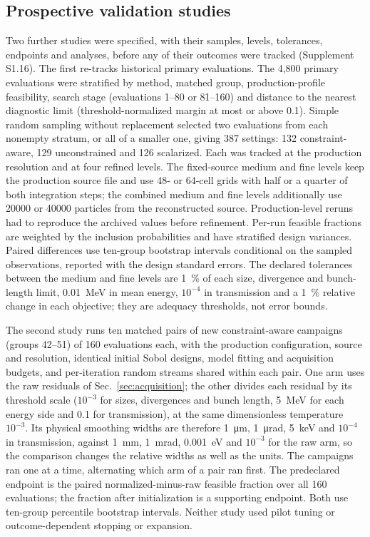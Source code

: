 \documentclass[aps,prab,reprint,superscriptaddress,amsmath,amssymb,floatfix]{revtex4-2}
\begin{document}
\subsection{Prospective validation studies}
\label{sec:prospective}
Two further studies were specified, with their samples, levels, tolerances, endpoints and
analyses, before any of their outcomes were tracked (Supplement S1.16). The first re-tracks
historical primary evaluations. The 4,800 primary evaluations were stratified by method, matched
group, production-profile feasibility, search stage (evaluations 1--80 or 81--160) and distance
to the nearest diagnostic limit (threshold-normalized margin at most or above 0.1). Simple random
sampling without replacement selected two evaluations from each nonempty stratum, or all of a
smaller one, giving 387 settings: 132 constraint-aware, 129 unconstrained and 126 scalarized.
Each was tracked at the production resolution and at four refined levels. The fixed-source
medium and fine levels keep the production source file and use 48- or 64-cell grids with half
or a quarter of both integration steps; the combined medium and fine levels additionally use
\num{20000} or \num{40000} particles from the reconstructed source. Production-level reruns had
to reproduce the archived values before refinement. Per-run feasible fractions are weighted by
the inclusion probabilities and have stratified design variances. Paired differences use
ten-group bootstrap intervals conditional on the sampled observations, reported with the design
standard errors. The declared tolerances between the medium and fine levels are \SI{1}{\percent}
of each size, divergence and bunch-length limit, \SI{0.01}{\mega\electronvolt} in mean energy,
$10^{-4}$ in transmission and a \SI{1}{\percent} relative change in each objective; they are
adequacy thresholds, not error bounds.

The second study runs ten matched pairs of new constraint-aware campaigns (groups 42--51) of
160 evaluations each, with the production configuration, source and resolution, identical
initial Sobol designs, model fitting and acquisition budgets, and per-iteration random streams
shared within each pair. One arm uses the raw residuals of Sec.~\ref{sec:acquisition}; the other
divides each residual by its threshold scale ($10^{-3}$ for sizes, divergences and bunch length,
\SI{5}{\mega\electronvolt} for each energy side and 0.1 for transmission), at the same
dimensionless temperature $10^{-3}$. Its physical smoothing widths are therefore
\SI{1}{\micro\metre}, \SI{1}{\micro\radian}, \SI{5}{\kilo\electronvolt} and $10^{-4}$ in
transmission, against \SI{1}{\milli\metre}, \SI{1}{\milli\radian}, \SI{0.001}{\electronvolt} and
$10^{-3}$ for the raw arm, so the comparison changes the relative widths as well as the units.
The campaigns ran one at a time, alternating which arm of a pair ran first. The predeclared
endpoint is the paired normalized-minus-raw feasible fraction over all 160 evaluations; the
fraction after initialization is a supporting endpoint. Both use ten-group percentile bootstrap
intervals. Neither study used pilot tuning or outcome-dependent stopping or expansion.
\end{document}
